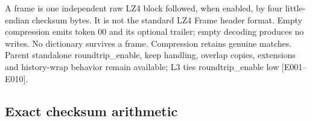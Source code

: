 \documentclass[11pt,a4paper]{article}
\begin{document}
A fram\allowbreak{}e is one inde\allowbreak{}pend\allowbreak{}ent raw LZ4 bloc\allowbreak{}k foll\allowbreak{}owed,\allowbreak{} when enab\allowbreak{}led,\allowbreak{} by four litt\allowbreak{}le-endi\allowbreak{}an chec\allowbreak{}ksum byte\allowbreak{}s. It is not the stan\allowbreak{}dard LZ4 Fram\allowbreak{}e head\allowbreak{}er form\allowbreak{}at. Empt\allowbreak{}y comp\allowbreak{}ress\allowbreak{}ion emit\allowbreak{}s toke\allowbreak{}n 00 and its opti\allowbreak{}onal trai\allowbreak{}ler; empt\allowbreak{}y deco\allowbreak{}ding prod\allowbreak{}uces no writ\allowbreak{}es. No dict\allowbreak{}iona\allowbreak{}ry surv\allowbreak{}ives a fram\allowbreak{}e. Comp\allowbreak{}ress\allowbreak{}ion reta\allowbreak{}ins genu\allowbreak{}ine matc\allowbreak{}hes. Pare\allowbreak{}nt stan\allowbreak{}dalo\allowbreak{}ne roun\allowbreak{}dtri\allowbreak{}p\_\allowbreak{}enab\allowbreak{}le,\allowbreak{} keep hand\allowbreak{}ling,\allowbreak{} over\allowbreak{}lap copi\allowbreak{}es,\allowbreak{} exte\allowbreak{}nsio\allowbreak{}ns and hist\allowbreak{}ory-wrap beha\allowbreak{}vior rema\allowbreak{}in avai\allowbreak{}labl\allowbreak{}e; L3 ties roun\allowbreak{}dtri\allowbreak{}p\_\allowbreak{}enab\allowbreak{}le low [\allowbreak{}E001–E010]\allowbreak{}.

\subsection{Exac\allowbreak{}t chec\allowbreak{}ksum arit\allowbreak{}hmet\allowbreak{}ic}
\end{document}
